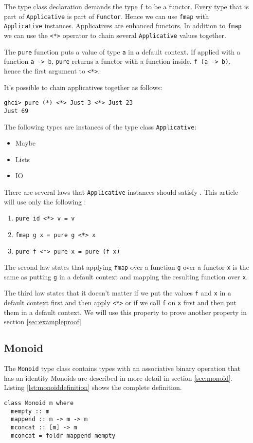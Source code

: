 The type class declaration demands the type \verb|f| to be a functor. Every type that is part of \verb|Applicative| is part of \verb|Functor|. Hence we can use \verb|fmap| with \verb|Applicative| instances.
Applicatives are enhanced functors. In addition to \verb|fmap| we can use the \verb|<*>| operator to chain several \verb|Applicative| values together.

The \verb|pure| function puts a value of type \verb|a| in a default context. If applied with a function \verb|a -> b|,  \verb|pure| returns a functor with a function inside, \verb|f (a -> b)|, hence the first argument to \verb|<*>|.

It's possible to chain applicatives together as follows:
\begin{verbatim}
ghci> pure (*) <*> Just 3 <*> Just 23
Just 69
\end{verbatim}

The following types are instances of the type class \verb|Applicative|:

\begin{itemize}
\item Maybe
\item Lists
\item IO
\end{itemize}

There are several laws that \verb|Applicative| instances should satisfy \cite{mcbride} \cite{control.applicative}. This article will use only the following :

\begin{enumerate}
\item \verb|pure id <*> v = v|
\item \verb|fmap g x = pure g <*> x|
\item \verb|pure f <*> pure x = pure (f x)|
\end{enumerate}

The second law states that applying \verb|fmap| over a  function \verb|g| over a functor \verb|x| is the same as putting \verb|g| in a default context and mapping the resulting function over \verb|x|.

The third law states that it doesn't matter if we put the values \verb|f| and \verb|x| in a default context first and then apply \verb|<*>| or if we call \verb|f| on \verb|x| first and then put them in a default context. We will use this property to prove another property in section \ref{sec:exampleproof}

\subsection{Monoid}
\label{sec:monoiddefinition}

The \verb|Monoid| type class contains types with an associative binary operation that has an identity
Monoids are described in more detail in section \ref{sec:monoid}. Listing \ref{lst:monoiddefinition} shows the complete definition.
\begin{lstlisting}[label={lst:monoiddefinition}, caption={Definition of type class monoid}]
class Monoid m where
  mempty :: m
  mappend :: m -> m -> m
  mconcat :: [m] -> m
  mconcat = foldr mappend mempty
\end{lstlisting}